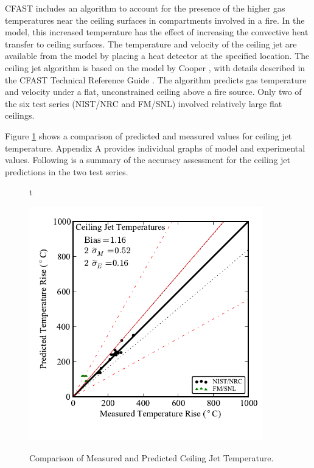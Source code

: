CFAST includes an algorithm to account for the presence of the higher gas temperatures near the ceiling surfaces in compartments involved in a fire.  In the model, this increased temperature has the effect of increasing the convective heat transfer to ceiling surfaces.  The temperature and velocity of the ceiling jet are available from the model by placing a heat detector at the specified location.  The ceiling jet algorithm is based on the model by Cooper \cite{Cooper:1991}, with details described in the CFAST Technical Reference Guide \cite{CFAST_Tech_Guide_6}.  The algorithm predicts gas temperature and velocity under a flat, unconstrained ceiling above a fire source.  Only two of the six test series (NIST/NRC and FM/SNL) involved relatively large flat ceilings.  

Figure \ref{fig:Ceiling_Jet_Scatter} shows a comparison of predicted and measured values for ceiling jet temperature. Appendix A provides individual graphs of model and experimental values. Following is a summary of the accuracy assessment for the ceiling jet predictions in the two test series.

\begin{figure}{t}
\begin{center}
\includegraphics[width=4.0in]{FIGURES/ScatterPlots/Ceiling_Jet_Temperature}  \\
\end{center}
\caption{Comparison of Measured and Predicted Ceiling Jet Temperature.} \label{fig:Ceiling_Jet_Scatter}
\end{figure}

